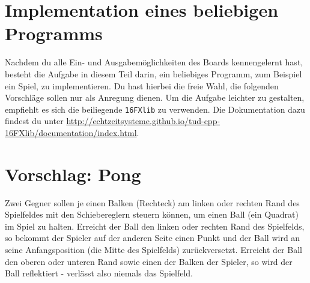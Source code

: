 
\newcommand{\exday}{6}
\cppSetTitle



\cppSetHeaderAndMakeTitle

\section{Implementation eines beliebigen Programms}
Nachdem du alle Ein- und Ausgabemöglichkeiten des Boards kennengelernt hast, besteht die Aufgabe in diesem Teil darin, ein beliebiges Programm, zum Beispiel ein Spiel, zu implementieren.
Du hast hierbei die freie Wahl, die folgenden Vorschläge sollen nur als Anregung dienen.
Um die Aufgabe leichter zu gestalten, empfiehlt es sich die beiliegende \texttt{16FXlib} zu verwenden.
Die Dokumentation dazu findest du unter \url{http://echtzeitsysteme.github.io/tud-cpp-16FXlib/documentation/index.html}.

\section*{Vorschlag: Pong}
Zwei Gegner sollen je einen Balken (Rechteck) am linken oder rechten Rand des Spielfeldes mit den Schiebereglern steuern können, um einen Ball (ein Quadrat) im Spiel zu halten.
Erreicht der Ball den linken oder rechten Rand des Spielfelds, so bekommt der Spieler auf der anderen Seite einen Punkt und der Ball wird an seine Anfangsposition (die Mitte des Spielfelds) zurückversetzt.
Erreicht der Ball den oberen oder unteren Rand sowie einen der Balken der Spieler, so wird der Ball reflektiert - verlässt also niemals das Spielfeld.


